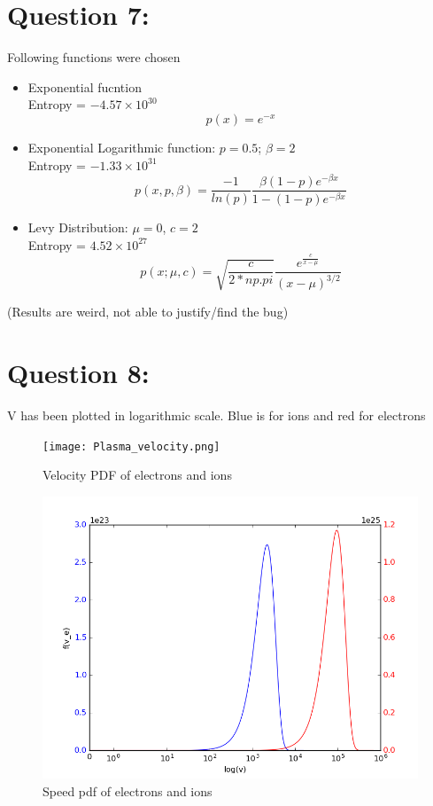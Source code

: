 \documentclass[11pt, a4paper]{article}
\begin{document}
\section{Question 7:}
Following functions were chosen
\begin{itemize}
 \item Exponential fucntion \\
  Entropy = $-4.57 \times 10^30$
 \begin{equation}
  p(x) = e^{-x}
 \end{equation}
 \item Exponential Logarithmic function: $p  = 0.5$; $\beta = 2$\\
  Entropy = $-1.33 \times 10^31$
 \begin{equation}
  p(x, p, \beta) = \frac{-1}{ln(p)} \frac{\beta (1-p)e^{-\beta x}}{1 - (1-p)e^{-\beta x}}
 \end{equation}
 \item Levy Distribution: $\mu = 0$, $c = 2$ \\
 Entropy = $4.52 \times 10^27$
 \begin{equation}
  p(x;\mu, c) = \sqrt{\frac{c}{2*np.pi}}\frac{e^{\frac{c}{x - \mu}}}{(x - \mu)^{3/2}}
 \end{equation}
\end{itemize}
(Results are weird, not able to justify/find the bug)

\section{Question 8:}
V has been plotted in logarithmic scale. Blue is for ions and red for electrons
\begin{figure}[H]
 \centering
 \texttt{[image: Plasma\_velocity.png]}
 \caption{Velocity PDF of electrons and ions}
 \label{fig:plasma_v}
\end{figure}

\begin{figure}[H]
 \centering
 \includegraphics[scale = 0.5]{Plasma_speed.png}
 \caption{Speed pdf of electrons and ions}
 \label{fig:plasma_s}
\end{figure}
\end{document}
